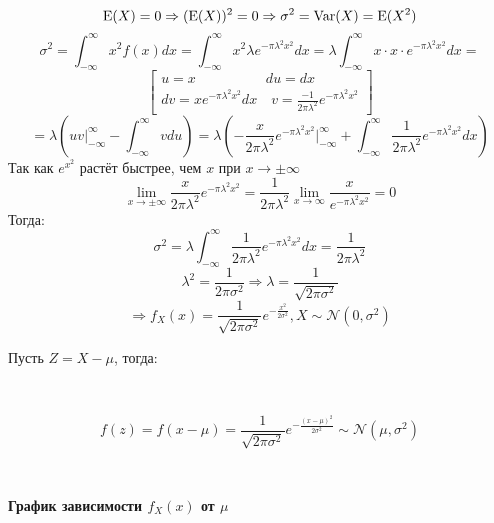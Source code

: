 \begin{frame}[t]
\begin{columns}[t]
\begin{column}{.465\textwidth}
\[\E(X)=0 \Rightarrow (\E(X))^2=0 \Rightarrow \sigma^2=\Var(X)=\E(X^2) \]
\[\sigma^2 =   \int_{-\infty}^{\infty} x^2 f(x) dx = 
  \int_{-\infty}^{\infty} x^2 \lambda e^{-\pi{\lambda}^2x^2}  dx =
	\lambda   \int_{-\infty}^{\infty} x\cdot x \cdot e^{-\pi{\lambda}^2x^2} dx =\]
\[ 
\left[\begin{matrix} u=x \quad \quad \quad \quad \quad du=dx\\ dv= x e^{-\pi{\lambda}^2x^2} dx \quad v=\frac{-1}{2\pi\lambda^2}e^{-\pi{\lambda}^2x^2}\end{matrix}\right]
\]
\[=\lambda \left( uv \bigg|_{-\infty}^{\infty}-   \int_{-\infty}^{\infty} vdu \right) = \lambda \left( -\frac{x}{2\pi\lambda^2}e^{-\pi{\lambda}^2x^2} \bigg|_{-\infty}^{\infty} +   \int_{-\infty}^{\infty} \frac{1}{2\pi\lambda^2}e^{-\pi{\lambda}^2x^2} dx \right)\]
Так как $e^{x^2}$ растёт быстрее, чем $x$ при $x \rightarrow \pm \infty$
\[\lim\limits_{x\to \pm \infty} \frac{x}{2\pi\lambda^2}e^{-\pi{\lambda}^2x^2} = 
\frac{1}{2\pi\lambda^2}\lim\limits_{x\to\infty} \frac{x}{ e^{-\pi{\lambda}^2x^2}}=0\]
Тогда:
\[\sigma^2 = \lambda  \int_{-\infty}^{\infty} \frac{1}{2\pi\lambda^2}e^{-\pi{\lambda}^2x^2} dx = \frac{1}{2\pi\lambda^2} \]
\[\lambda^2 = \frac{1}{2\pi\sigma^2} \Rightarrow \lambda = \frac{1}{\sqrt{2\pi\sigma^2}} \]
\[\Rightarrow f_X(x)=\frac{1}{\sqrt{2\pi\sigma^2}} e ^ {-\frac{x^2}{2\sigma^2}}, X \sim \mathcal{N}(0, \sigma^2)\]

Пусть $Z=X-\mu$, тогда:
\vspace{2cm}
\begin{tcolorbox}[colback = canaryyellow]

\\
\begin{huge}
\vspace{1cm}
\[f(z)=f(x-\mu) = \frac{1}{\sqrt{2\pi\sigma^2}} e ^ {-\frac{(x-\mu)^2}{2\sigma^2}} \sim \mathcal{N}(\mu, \sigma^2)\]
\vspace{0.4 in} 
\end{huge}
\\
\end{tcolorbox}
\vspace{2cm}

\begin{tcolorbox}[colback = beaublue]

\begin{center}
    \textbf{График зависимости $f_X(x)$ от $\mu$}
\end{center}
\end{tcolorbox}
\vspace{2.5cm}
	\begin{tikzpicture}
		
	\end{tikzpicture}
	

\end{column}
\end{columns}
\end{frame}
